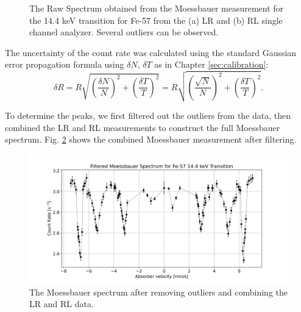 \documentclass[a4paper]{report}
\numberwithin{equation}{section}
\begin{document}
\begin{figure}[htb!]
	\centering
	\quad
	\centering
	\caption{The Raw Spectrum obtained from the Moessbauer measurement for the 14.4 keV transition for Fe-57 from the (a) LR and (b) RL 
	single channel analyzer. Several outliers can be observed.}
	\label{fig:moess_raw}
\end{figure}


The uncertainty of the count rate was calculated using the standard Gaussian error propagation formula using $\delta N$, $\delta T$ 
as in Chapter \ref{sec:calibration}:
\begin{equation}
	\delta R = R \sqrt{\left(\frac{\delta N}{N}\right)^2 + \left(\frac{\delta T}{T}\right)^2} = R \sqrt{\left(\frac{\sqrt{N}}{N}\right)^2 + \left(\frac{\delta T}{T}\right)^2} .
\end{equation} \par 


To determine the peaks, we first filtered out the outliers from the data, then combined the LR and RL measurements to construct 
the full Moessbauer spectrum. Fig. \ref{fig:moess_spect_filt} shows the combined Moessbauer measurement after filtering. \par 

\begin{figure}[htb!]
	\centering
	\includegraphics[width=0.8\columnwidth]{moess_spect_filt.png}
	\caption{The Moessbauer spectrum after removing outliers and combining the LR and RL data.}
	\label{fig:moess_spect_filt}
\end{figure}
\end{document}
